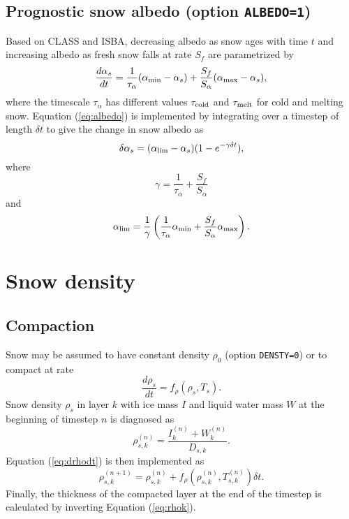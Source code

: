 \documentclass{article}
\begin{document}
\subsection{Prognostic snow albedo (option {\tt ALBEDO=1})}

Based on CLASS and ISBA, decreasing albedo as snow ages with time $t$ and increasing albedo as fresh snow falls at rate $S_f$ are parametrized by
\begin{equation}
\frac{d\alpha_s}{dt} = \frac{1}{\tau_\alpha}(\alpha_{\rm min} - \alpha_s) + \frac{S_f}{S_\alpha}(\alpha_{\rm max} - \alpha_s),
\label{eq:albedo} 
\end{equation} 
where the timescale $\tau_\alpha$ has different values $\tau_{\rm cold}$ and $\tau_{\rm melt}$ for cold and melting snow. Equation (\ref{eq:albedo}) is implemented by integrating over a timestep of length $\delta t$ to give the change in snow albedo as
\begin{equation}
\delta\alpha_s = (\alpha_{\rm lim} - \alpha_s)(1-e^{-\gamma\delta t}),  
\end{equation}
where
\begin{equation}
\gamma = \frac{1}{\tau_\alpha}+\frac{S_f}{S_\alpha}
\end{equation}
and
\begin{equation}
\alpha_{\rm lim} = \frac{1}{\gamma}\left(\frac{1}{\tau_\alpha}\alpha_{\rm min} +\frac{S_f}{S_\alpha}\alpha_{\rm max}\right).
\end{equation}

\section{Snow density}

\subsection{Compaction}
Snow may be assumed to have constant density $\rho_0$ (option {\tt DENSTY=0}) or to compact at rate
\begin{equation}
\frac{d\rho_s}{dt} = f_\rho(\rho_s,T_s).
\label{eq:drhodt}
\end{equation}
Snow density $\rho_s$ in layer $k$ with ice mass $I$ and liquid water mass $W$ at the beginning of timestep $n$ is diagnosed as
\begin{equation}
\rho_{s,k}^{(n)} = \frac{I_k^{(n)} + W_k^{(n)}}{D_{s,k}}.
\label{eq:rhok}
\end{equation}
Equation (\ref{eq:drhodt}) is then implemented as
\begin{equation}
\rho_{s,k}^{(n+1)} = \rho_{s,k}^{(n)} + f_\rho\left(\rho_{s,k}^{(n)},T_{s,k}^{(n)}\right)\delta t.
\end{equation}
Finally, the thickness of the compacted layer at the end of the timestep is calculated by inverting Equation (\ref{eq:rhok}).
\end{document}
